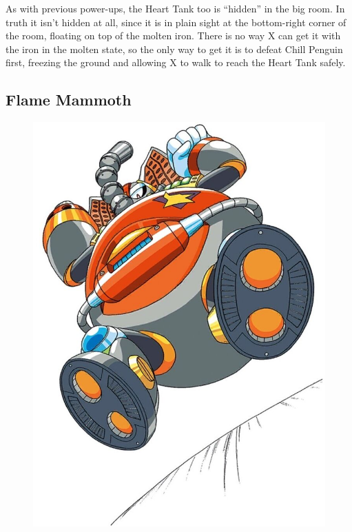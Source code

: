 As with  previous power-ups, the Heart Tank too is ``hidden'' in the big room. In truth it isn't hidden at all, since it is in plain sight at the bottom-right corner of the room, floating on top of the molten iron. There is no way X can get it with the iron in the molten state, so the only way to get it is to defeat Chill Penguin first, freezing the ground and allowing X to walk to reach the Heart Tank safely.


\subsection{Flame Mammoth}\label{boss:Flame_mammoth}
\begin{figure}[htp]
	\centering
	\includegraphics[height=\portraitsize]{figures/X1/Flame_mammoth/Flame_mammoth.jpg}

\end{figure}
